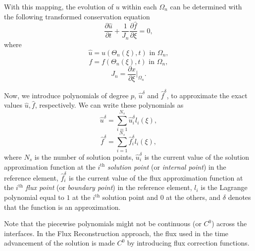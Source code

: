 With this mapping, the evolution of $u$ within each $\Omega_n$ can be determined with the following 
transformed conservation equation
\begin{equation}
\frac{\partial \hat{u}}{\partial t} + \frac{1}{J_n}\frac{\partial \hat{f}}{\partial \xi} = 0,
\end{equation}
where
\begin{equation}
\hat{u} = u(\Theta_n(\xi),t) \text{ in } \Omega_n,
\end{equation}
\begin{equation}
\hat{f} = f(\Theta_n(\xi),t) \text{ in } \Omega_n,
\end{equation}
\begin{equation}
J_n = \frac{\partial x}{\partial \xi} \bigg|_{\Omega_n}.
\end{equation}

Now, we introduce polynomials of degree $p$, $\hat{u}^\delta$ and $\hat{f}^\delta$, to approximate the exact values $\hat{u},\hat{f}$, respectively. We can write these polynomials as
\begin{equation}
\hat{u}^\delta = \sum_{i=1}^{N_s} \hat{u}_i^\delta l_i(\xi),
\end{equation}
\begin{equation}
\hat{f}^\delta = \sum_{i=1}^{N_s} \hat{f}_i^\delta l_i(\xi),
\end{equation}
where $N_s$ is the number of solution points, $\hat{u}_i^\delta$ is the current value of the 
solution approximation function at the $i^\text{th}$ \emph{solution point} (or \emph{internal point}) in the reference element, 
$\hat{f}_i^\delta$ is the current value of the flux approximation function at the $i^\text{th}$ 
\emph{flux point} (or \emph{boundary point}) in the reference element, $l_i$ is the Lagrange polynomial equal to $1$ at the 
$i^\text{th}$ solution point and $0$ at the others, and $\delta$ denotes that the function is an 
approximation.

Note that the piecewise polynomials might not be continuous (or $C^0$) across the interfaces. In the 
Flux Reconstruction approach, the flux used in the time advancement of the solution is made $C^0$ 
by introducing flux correction functions.


